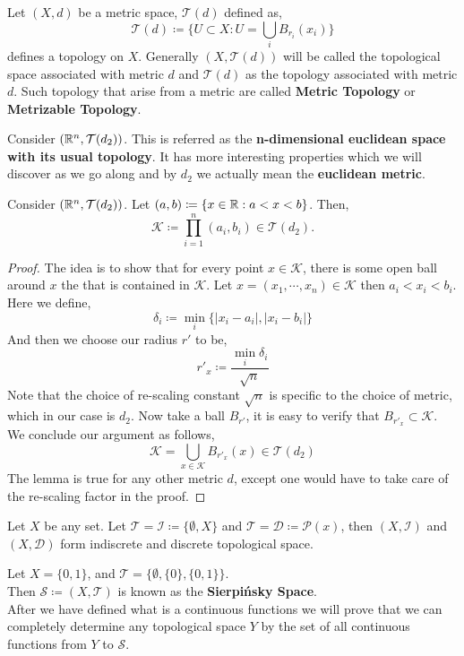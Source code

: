 \documentclass{scrartcl} %
\newcommand{\Tau}{\mathcal{T}}
\newcommand{\sP}{\mathcal{P}}
\newcommand{\sI}{\mathcal{I}}
\newcommand{\sD}{\mathcal{D}}
\newcommand{\sS}{\mathcal{S}}
\begin{document}
\begin{theorem}
Let $\left(X, d\right)$ be a metric space, $\Tau(d)$
defined as, 
\[
	\Tau(d) \coloneq \{ U \subset X : U = 
	\bigcup\limits_i B_{r_i} (x_i) \}
\]
defines a topology on $X$. Generally $\left(X, \Tau(d)
	\right)$ will be called the topological space
associated with metric $d$ and $\Tau(d)$ as the topology
associated with metric $d$. Such topology that arise
from a metric are called \textbf{Metric Topology} or 
\textbf{Metrizable Topology}.
\end{theorem}
\begin{remark}
Consider $\left(\RR^n, \Tau(d_2)\right)$. This is referred as the \textbf{n-dimensional euclidean space with its usual
topology}. It has more interesting properties which we will discover as we go along and by $d_2$ we actually mean the
\textbf{euclidean metric}.
\end{remark}
\begin{lemma}
	Consider $\left(\RR^n, \Tau(d_2)\right)$. Let $\left(a,b\right) \coloneq \{x \in \mathbb R : a < x < b \}$. 
	Then, 
\[
	\mathcal{K} \coloneq \prod\limits_{i=1}^n \left(a_i, b_i\right) \in \Tau(d_2).
\]
\end{lemma}
\begin{proof}
	The idea is to show that for every point $x \in \mathcal{K}$, there is some open ball around $x$
	the that is contained in $\mathcal{K}$. 
Let $x = \left(x_1,\cdots,x_n\right) \in \mathcal{K}$ then $a_i < x_i < b_i$.
Here we define,
\[
	\delta_i \coloneq \min_i \{|x_i - a_i|, |x_i - b_i|\}
\]
And then we choose our radius $r'$ to be,
\[
	r'_x \coloneq \dfrac{\min\limits_i\delta_i}{\sqrt{n}}
\]
Note that the choice of re-scaling constant $\sqrt{n}$ is specific to the choice of metric, which in our case is $d_2$. Now take a ball $B_{r'}$, it is easy to verify that $B_{r'_x} \subset \mathcal{K}$.
We conclude our argument as follows,
\[
   \mathcal{K} = \bigcup\limits_{x \in \mathcal{K}} B_{r'_x}(x) \in \Tau(d_2)
\]
The lemma is true for any other metric $d$, except one would have to take care of the re-scaling factor in the proof.
\end{proof}
\begin{example}
	\label{ex:di}
Let $X$ be any set. Let $\Tau = \sI \coloneq \{\emptyset
, X\}$ and $\Tau = \sD \coloneq \sP(x)$, then 
$\left(X, \sI\right)$ and $\left(X, \sD\right)$ form
indiscrete and discrete topological space.
\end{example}
\begin{example}
\label{ex:sierpspace}
	Let $X = \{0, 1\}$, and
	$\Tau = \{\emptyset, \{0\}, \{0, 1\} \}$.\\
Then $\sS \coloneq \left(X, \Tau \right)$
	is known as the \textbf{Sierpi\'nsky Space}. \\
	After we have defined what is a continuous 
	functions we will prove that we can completely
	determine any topological space $Y$ by the
	set of all continuous functions from
	$Y$ to $\sS$.
\end{example}
\end{document}
